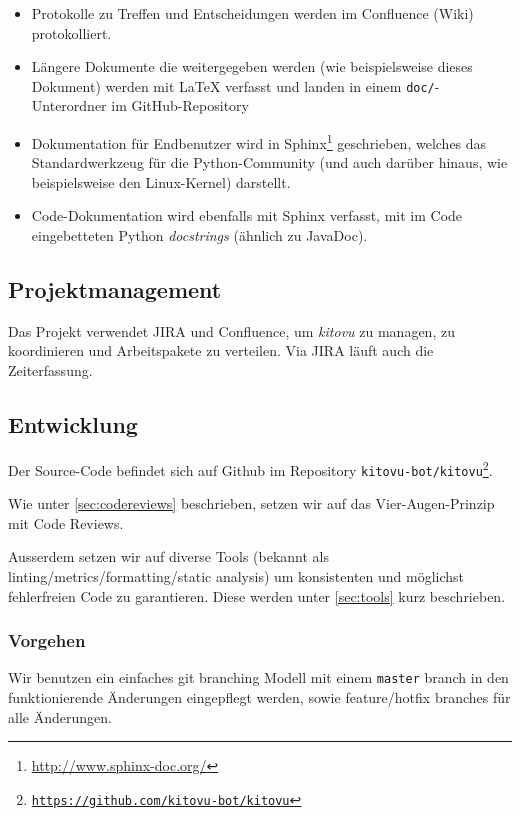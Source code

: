\documentclass[a4paper]{article}
\begin{document}
\begin{itemize}
  \item Protokolle zu Treffen und Entscheidungen werden im Confluence (Wiki) protokolliert.
  \item Längere Dokumente die weitergegeben werden (wie beispielsweise dieses
    Dokument) werden mit \LaTeX{} verfasst und landen in einem
    \texttt{doc/}-Unterordner im GitHub-Repository
  \item Dokumentation für Endbenutzer wird in
    Sphinx\footnote{\url{http://www.sphinx-doc.org/}} geschrieben, welches das
    Standardwerkzeug für die Python-Community (und auch darüber hinaus, wie
    beispielsweise den Linux-Kernel) darstellt.
  \item Code-Dokumentation wird ebenfalls mit Sphinx verfasst, mit im Code
    eingebetteten Python \emph{docstrings} (ähnlich zu JavaDoc).
\end{itemize}

\subsection{Projektmanagement}
Das Projekt verwendet JIRA und Confluence, um \emph{kitovu} zu managen, zu koordinieren und Arbeitspakete zu verteilen. Via JIRA läuft auch die Zeiterfassung.

\subsection{Entwicklung}

Der Source-Code befindet sich auf Github im Repository \texttt{kitovu-bot/kitovu\footnote{\url{https://github.com/kitovu-bot/kitovu}}}.

Wie unter \ref{sec:codereviews} beschrieben, setzen wir auf das
Vier-Augen-Prinzip mit Code Reviews.

Ausserdem setzen wir auf diverse Tools (bekannt als
linting/metrics/formatting/static analysis) um konsistenten und möglichst
fehlerfreien Code zu garantieren. Diese werden unter \ref{sec:tools} kurz beschrieben.

\subsubsection{Vorgehen}
Wir benutzen ein einfaches git branching Modell mit einem \verb|master| branch
in den funktionierende Änderungen eingepflegt werden, sowie feature/hotfix
branches für alle Änderungen.
\end{document}
